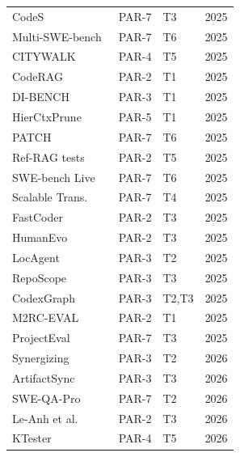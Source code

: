 \begin{longtable}{p{5cm}p{1.2cm}p{1.5cm}r}
CodeS~\cite{zan2025codes}                        & PAR-7 & T3       & 2025 \\
Multi-SWE-bench~\cite{zan2025multiswebench}       & PAR-7 & T6       & 2025 \\
CITYWALK~\cite{zhang2025citywalk}                & PAR-4 & T5       & 2025 \\
CodeRAG~\cite{zhang2025coderag}                  & PAR-2 & T1       & 2025 \\
DI-BENCH~\cite{zhang2025dibench}                 & PAR-3 & T1       & 2025 \\
HierCtxPrune~\cite{zhang2025hierarchical}         & PAR-5 & T1       & 2025 \\
PATCH~\cite{zhang2025patch}                      & PAR-7 & T6       & 2025 \\
Ref-RAG tests~\cite{zhang2025refbased}            & PAR-2 & T5       & 2025 \\
SWE-bench Live~\cite{zhang2025swebenchlive}       & PAR-7 & T6       & 2025 \\
Scalable Trans.~\cite{zhang2025scalable}          & PAR-7 & T4       & 2025 \\
FastCoder~\cite{zhao2025fastcoder}               & PAR-2 & T3       & 2025 \\
HumanEvo~\cite{zheng2025humanevo}               & PAR-2 & T3       & 2025 \\
LocAgent~\cite{chen2025locagent}                 & PAR-3 & T2       & 2025 \\
RepoScope~\cite{liu2025reposcope}                & PAR-3 & T3       & 2025 \\
CodexGraph~\cite{liu2025codexgraph}              & PAR-3 & T2,T3    & 2025 \\
M2RC-EVAL~\cite{liu2025m2rceval}                 & PAR-2 & T1       & 2025 \\
ProjectEval~\cite{liu2025projecteval}             & PAR-7 & T3       & 2025 \\
Synergizing~\cite{abedu2026synergizing}           & PAR-3 & T2       & 2026 \\
ArtifactSync~\cite{alor2026artifactsync}         & PAR-3 & T3       & 2026 \\
SWE-QA-Pro~\cite{cai2026sweqapro}               & PAR-7 & T2       & 2026 \\
Le-Anh et al.~\cite{leanh2026donot}             & PAR-2 & T3       & 2026 \\
KTester~\cite{li2026ktester}                     & PAR-4 & T5       & 2026 \\

\end{longtable}
